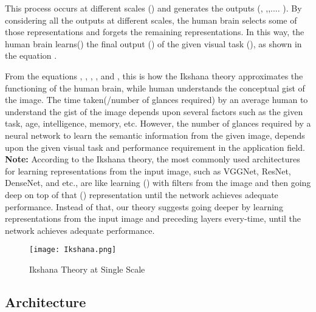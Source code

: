\documentclass{article}
\begin{document}
This process occurs at different scales () and generates the outputs (, ,,.... ).  By considering all the outputs at different scales, the human brain selects some of those representations and forgets the remaining representations. In this way, the human brain learns() the final output () of the given visual task (), as shown in the equation .

From the equations , , , , and , this is how the Ikshana theory approximates the functioning of the human brain, while human understands the conceptual gist of the image.\newline
The time taken(/number of glances required) by an average human to understand the gist of the image depends upon several factors such as the given task, age, intelligence, memory, etc. However, the number of glances required by a neural network to learn the semantic information from the given image, depends upon the given visual task and performance requirement in the application field.\newline 
\newline
\textbf{Note:} According to the Ikshana theory, the most commonly used architectures for learning representations from the input image, such as VGGNet\cite{7486599}, ResNet\cite{he2016deep}, DenseNet\cite{huang2017densely}, and etc., are like learning () with  filters from the image and then going deep on top of that () representation until the network achieves adequate performance. Instead of that, our theory suggests going deeper by learning  representations from the input image and preceding layers every-time, until the network achieves adequate performance.
\newline
\begin{figure}[t]
\begin{center}
   \texttt{[image: Ikshana.png]}
\end{center}
   \caption{Ikshana Theory at Single Scale}
\label{fig:ikshana}
\end{figure}



\subsection{Architecture}
\end{document}
